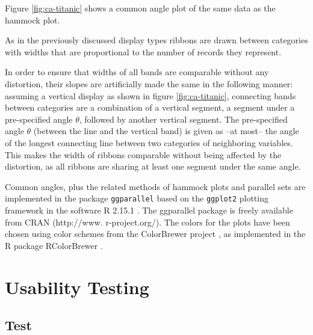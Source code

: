 Figure \ref{fig:ca-titanic} shows a common angle plot of the same data as the hammock plot.

As in the previously discussed display types ribbons are drawn between categories with widths  that are proportional to  the number of records they represent.

In order to ensure that  widths of all bands are  comparable without any distortion, their slopes  are artificially made the same in the following manner: 
assuming a vertical display as shown in figure \ref{fig:ca-titanic},  connecting bands between  categories  are a combination of a vertical  segment, a  segment under a pre-specified angle $\theta$, followed by another vertical  segment.  
The pre-specified angle $\theta$ (between the line and the vertical band) is given as --at most-- the angle of the longest connecting line between two categories of neighboring variables. 
This makes the width of ribbons  comparable without being affected by the distortion, as all ribbons are sharing at least one segment under the same angle. 


Common angles, plus the related methods of hammock plots and parallel sets are implemented in the  package \texttt{ggparallel} based on the \texttt{ggplot2} \cite{ggplot2} plotting framework in the software R 2.15.1 \cite{R}. The ggparallel package is freely available from CRAN (http://www. r-project.org/). The colors for the plots have been chosen using color schemes from the ColorBrewer project \cite{colorbrewer}, as implemented in the R package RColorBrewer \cite{RColorBrewer}.

\section{Usability Testing}
\subsection{Test} \label{test}

